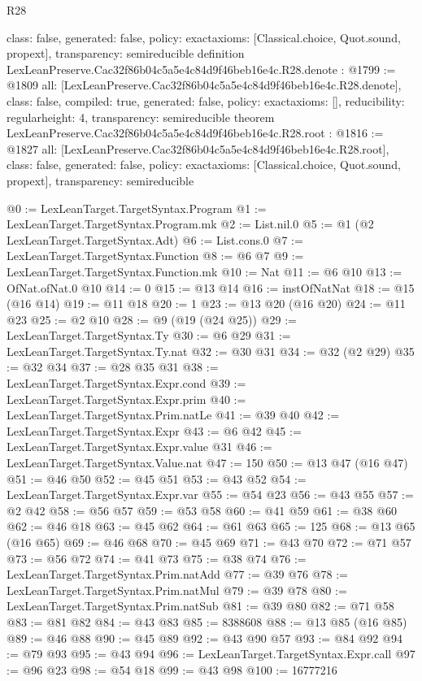 \begin{lexlean}{R28}
\begin{coremodule}
{  class: false,
  generated: false,
  policy: exact{axioms: [Classical.choice, Quot.sound, propext]},
  transparency: semireducible
}
definition LexLeanPreserve.Cac32f86b04c5a5e4c84d9f46beb16e4c.R28.denote : @1799 := @1809 {
  all: [LexLeanPreserve.Cac32f86b04c5a5e4c84d9f46beb16e4c.R28.denote],
  class: false,
  compiled: true,
  generated: false,
  policy: exact{axioms: []},
  reducibility: regular{height: 4},
  transparency: semireducible
}
theorem LexLeanPreserve.Cac32f86b04c5a5e4c84d9f46beb16e4c.R28.root : @1816 := @1827 {
  all: [LexLeanPreserve.Cac32f86b04c5a5e4c84d9f46beb16e4c.R28.root],
  class: false,
  generated: false,
  policy: exact{axioms: [Classical.choice, Quot.sound, propext]},
  transparency: semireducible
}

@0 := LexLeanTarget.TargetSyntax.Program
@1 := LexLeanTarget.TargetSyntax.Program.mk
@2 := List.nil.{0}
@5 := @1 (@2 LexLeanTarget.TargetSyntax.Adt)
@6 := List.cons.{0}
@7 := LexLeanTarget.TargetSyntax.Function
@8 := @6 @7
@9 := LexLeanTarget.TargetSyntax.Function.mk
@10 := Nat
@11 := @6 @10
@13 := OfNat.ofNat.{0} @10
@14 := 0
@15 := @13 @14
@16 := instOfNatNat
@18 := @15 (@16 @14)
@19 := @11 @18
@20 := 1
@23 := @13 @20 (@16 @20)
@24 := @11 @23
@25 := @2 @10
@28 := @9 (@19 (@24 @25))
@29 := LexLeanTarget.TargetSyntax.Ty
@30 := @6 @29
@31 := LexLeanTarget.TargetSyntax.Ty.nat
@32 := @30 @31
@34 := @32 (@2 @29)
@35 := @32 @34
@37 := @28 @35 @31
@38 := LexLeanTarget.TargetSyntax.Expr.cond
@39 := LexLeanTarget.TargetSyntax.Expr.prim
@40 := LexLeanTarget.TargetSyntax.Prim.natLe
@41 := @39 @40
@42 := LexLeanTarget.TargetSyntax.Expr
@43 := @6 @42
@45 := LexLeanTarget.TargetSyntax.Expr.value @31
@46 := LexLeanTarget.TargetSyntax.Value.nat
@47 := 150
@50 := @13 @47 (@16 @47)
@51 := @46 @50
@52 := @45 @51
@53 := @43 @52
@54 := LexLeanTarget.TargetSyntax.Expr.var
@55 := @54 @23
@56 := @43 @55
@57 := @2 @42
@58 := @56 @57
@59 := @53 @58
@60 := @41 @59
@61 := @38 @60
@62 := @46 @18
@63 := @45 @62
@64 := @61 @63
@65 := 125
@68 := @13 @65 (@16 @65)
@69 := @46 @68
@70 := @45 @69
@71 := @43 @70
@72 := @71 @57
@73 := @56 @72
@74 := @41 @73
@75 := @38 @74
@76 := LexLeanTarget.TargetSyntax.Prim.natAdd
@77 := @39 @76
@78 := LexLeanTarget.TargetSyntax.Prim.natMul
@79 := @39 @78
@80 := LexLeanTarget.TargetSyntax.Prim.natSub
@81 := @39 @80
@82 := @71 @58
@83 := @81 @82
@84 := @43 @83
@85 := 8388608
@88 := @13 @85 (@16 @85)
@89 := @46 @88
@90 := @45 @89
@92 := @43 @90 @57
@93 := @84 @92
@94 := @79 @93
@95 := @43 @94
@96 := LexLeanTarget.TargetSyntax.Expr.call
@97 := @96 @23
@98 := @54 @18
@99 := @43 @98
@100 := 16777216

\end{coremodule}
\end{lexlean}
